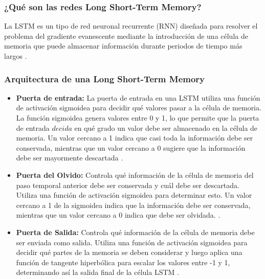 \subsubsection{¿Qué son las redes Long Short-Term Memory?}

La LSTM es un tipo de red neuronal recurrente (RNN) diseñada para resolver el problema del gradiente evanescente mediante la introducción de una célula de memoria que puede almacenar información durante periodos de tiempo más largos \cite{redes-lstm-long-short-term-memory}.

\subsubsection{Arquitectura de una Long Short-Term Memory}

\begin{itemize}
    \item \textbf{Puerta de entrada:} La puerta de entrada en una LSTM utiliza una función de activación sigmoidea para decidir qué valores pasar a la célula de memoria. La función sigmoidea genera valores entre 0 y 1, lo que permite que la puerta de entrada \( decida \) en qué grado un valor debe ser almacenado en la célula de memoria. Un valor cercano a 1 indica que casi toda la información debe ser conservada, mientras que un valor cercano a 0 sugiere que la información debe ser mayormente descartada \cite{redes-lstm-long-short-term-memory}.
\end{itemize}

\begin{itemize}
    \item \textbf{Puerta del Olvido:} Controla qué información de la célula de memoria del paso temporal anterior debe ser conservada y cuál debe ser descartada. Utiliza una función de activación sigmoidea para determinar esto. Un valor cercano a 1 de la sigmoidea indica que la información debe ser conservada, mientras que un valor cercano a 0 indica que debe ser olvidada. \cite{redes-lstm-long-short-term-memory}.
\end{itemize}

\begin{itemize}
    \item \textbf{Puerta de Salida:} Controla qué información de la célula de memoria debe ser enviada como salida. Utiliza una función de activación sigmoidea para decidir qué partes de la memoria se deben considerar y luego aplica una función de tangente hiperbólica para escalar los valores entre -1 y 1, determinando así la salida final de la célula LSTM \cite{redes-lstm-long-short-term-memory}.
\end{itemize}

